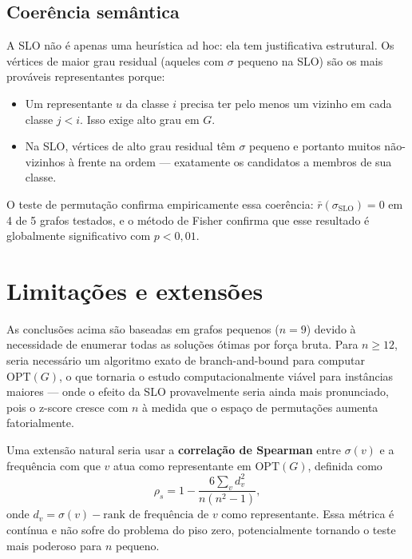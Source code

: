 \documentclass[a4paper,11pt]{article}
\begin{document}
\subsection{Coerência semântica}

A SLO não é apenas uma heurística ad hoc: ela tem justificativa
estrutural. Os vértices de maior grau residual (aqueles com $\sigma$
pequeno na SLO) são os mais prováveis representantes porque:
\begin{itemize}
  \item Um representante $u$ da classe $i$ precisa ter pelo menos
    um vizinho em cada classe $j < i$. Isso exige alto grau em $G$.
  \item Na SLO, vértices de alto grau residual têm $\sigma$ pequeno
    e portanto muitos não-vizinhos à frente na ordem — exatamente
    os candidatos a membros de sua classe.
\end{itemize}

O teste de permutação confirma empiricamente essa coerência:
$\bar{r}(\sigma_{\text{SLO}}) = 0$ em 4 de 5 grafos testados,
e o método de Fisher confirma que esse resultado é globalmente
significativo com $p < 0{,}01$.

\section{Limitações e extensões}

\begin{atencao}
As conclusões acima são baseadas em grafos pequenos ($n=9$) devido
à necessidade de enumerar todas as soluções ótimas por força bruta.
Para $n \geq 12$, seria necessário um algoritmo exato de
branch-and-bound para computar $\text{OPT}(G)$, o que tornaria o
estudo computacionalmente viável para instâncias maiores — onde o
efeito da SLO provavelmente seria ainda mais pronunciado, pois o
z-score cresce com $n$ à medida que o espaço de permutações aumenta
fatorialmente.
\end{atencao}

Uma extensão natural seria usar a \textbf{correlação de Spearman}
entre $\sigma(v)$ e a frequência com que $v$ atua como representante
em $\text{OPT}(G)$, definida como
\[
  \rho_s = 1 - \frac{6\sum_v d_v^2}{n(n^2-1)},
\]
onde $d_v = \sigma(v) - \text{rank de frequência de }v$ como
representante. Essa métrica é contínua e não sofre do problema do
piso zero, potencialmente tornando o teste mais poderoso para $n$
pequeno.
\end{document}

